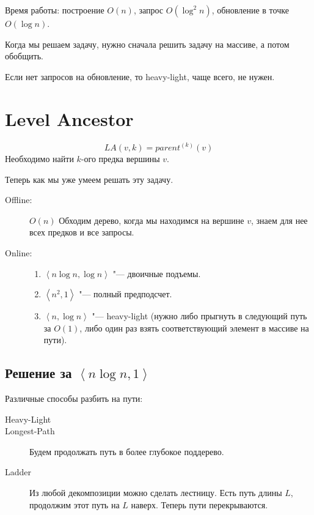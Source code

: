 Время работы: построение $O(n)$, запрос $O(\log^2 n)$, обновление в точке $O(\log n)$.

\begin{Rem}
	Когда мы решаем задачу, нужно сначала решить задачу на массиве, а потом обобщить.
\end{Rem}

Если нет запросов на обновление, то heavy-light, чаще всего, не нужен.

\section{Level Ancestor}

\begin{Def}
	\[ LA(v, k) = parent^{(k)}(v) \]
	Необходимо найти $k$-ого предка вершины $v$.
\end{Def}

Теперь как мы уже умеем решать эту задачу.
\begin{description}
\item[Offline:]
	$O(n)$
	Обходим дерево, когда мы находимся на вершине $v$, знаем для нее всех предков и все запросы.

\item[Online:]
	\begin{enumerate}
	\item
		$\left<n\log n, \log n\right>$ "--- двоичные подъемы.

	\item
		$\left<n^2, 1\right>$ "--- полный предподсчет.

	\item
		$\left<n, \log n\right>$ "--- heavy-light (нужно либо прыгнуть в следующий путь за $O(1)$,
		либо один раз взять соответствующий элемент в массиве на пути).
	\end{enumerate}
\end{description}

\subsection{Решение за \texorpdfstring{$\left<n\log n, 1\right>$}{<n log n, 1>}}

Различные способы разбить на пути:
\begin{description}
	\item[Heavy-Light]
	\item[Longest-Path] Будем продолжать путь в более глубокое поддерево.
	\item[Ladder] Из любой декомпозиции можно сделать лестницу. Есть путь длины $L$, продолжим этот путь на $L$ наверх. Теперь пути перекрываются.
\end{description}

